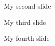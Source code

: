 \documentclass[aspectratio=169,handout]{beamer}
\begin{document}
{
  \begin{frame}
    \titlepage
  \end{frame}
}

\begin{frame}
  My second slide
\end{frame}

\begin{frame}
  My third slide
\end{frame}

\begin{frame}
  My fourth slide
\end{frame}
\end{document}
